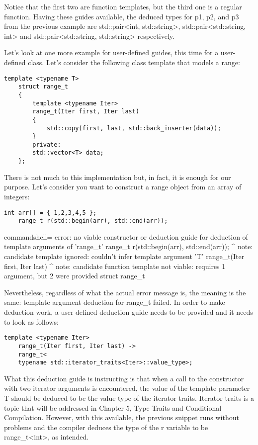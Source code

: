Notice that the first two are function templates, but the third one is a regular function. Having these guides available, the deduced types for p1, p2, and p3 from the previous example are std::pair<int, std::string>, std::pair<std::string, int> and std::pair<std::string, std::string> respectively.

Let’s look at one more example for user-defined guides, this time for a user-defined class. Let’s consider the following class template that models a range:

\begin{lstlisting}[style=styleCXX]
	template <typename T>
	struct range_t
	{
		template <typename Iter>
		range_t(Iter first, Iter last)
		{
			std::copy(first, last, std::back_inserter(data));
		}
		private:
		std::vector<T> data;
	};
\end{lstlisting}

There is not much to this implementation but, in fact, it is enough for our purpose. Let’s consider you want to construct a range object from an array of integers:

\begin{lstlisting}[style=styleCXX]
	int arr[] = { 1,2,3,4,5 };
	range_t r(std::begin(arr), std::end(arr));
\end{lstlisting}

\begin{tcblisting}{commandshell={}}
	error: no viable constructor or deduction guide for deduction
	of template arguments of 'range_t'
	range_t r(std::begin(arr), std::end(arr));
	^
	note: candidate template ignored: couldn't infer template
	argument 'T'
	range_t(Iter first, Iter last)
	^
	note: candidate function template not viable: requires 1
	argument, but 2 were provided
	struct range_t
\end{tcblisting}

Nevertheless, regardless of what the actual error message is, the meaning is the same: template argument deduction for range\_t failed. In order to make deduction work, a user-defined deduction guide needs to be provided and it needs to look as follows:

\begin{lstlisting}[style=styleCXX]
	template <typename Iter>
	range_t(Iter first, Iter last) ->
	range_t<
	typename std::iterator_traits<Iter>::value_type>;
\end{lstlisting}

What this deduction guide is instructing is that when a call to the constructor with two iterator arguments is encountered, the value of the template parameter T should be deduced to be the value type of the iterator traits. Iterator traits is a topic that will be addressed in Chapter 5, Type Traits and Conditional Compilation. However, with this available, the previous snippet runs without problems and the compiler deduces the type of the r variable to be range\_t<int>, as intended.

